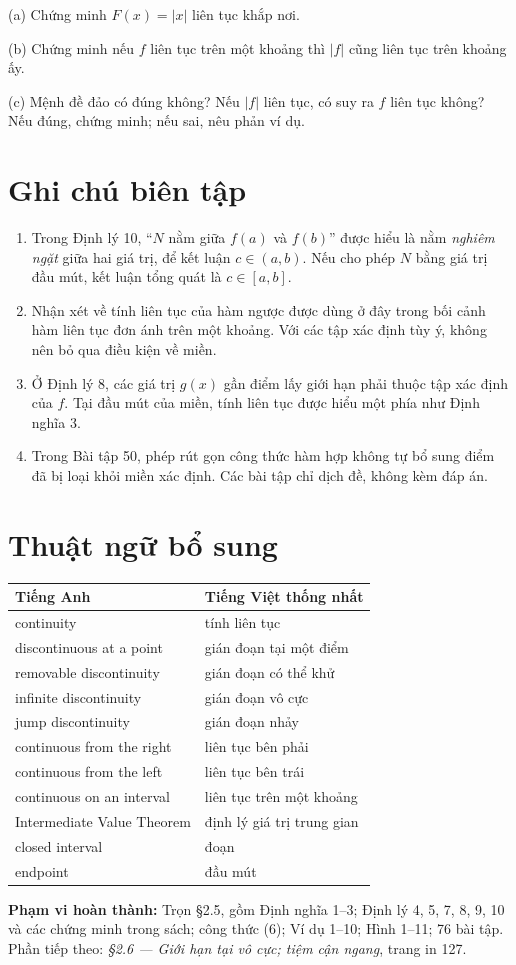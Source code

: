 \documentclass[12pt,a4paper]{article}
\begin{document}
(a) Chứng minh $F(x)=|x|$ liên tục khắp nơi.

(b) Chứng minh nếu $f$ liên tục trên một khoảng thì $|f|$ cũng liên tục trên khoảng ấy.

(c) Mệnh đề đảo có đúng không? Nếu $|f|$ liên tục, có suy ra $f$ liên tục không? Nếu đúng, chứng minh; nếu sai, nêu phản ví dụ.
\section*{Ghi chú biên tập}
\begin{enumerate}
\item Trong Định lý 10, ``$N$ nằm giữa $f(a)$ và $f(b)$'' được hiểu là nằm \textit{nghiêm ngặt} giữa hai giá trị, để kết luận $c\in(a,b)$. Nếu cho phép $N$ bằng giá trị đầu mút, kết luận tổng quát là $c\in[a,b]$.
\item Nhận xét về tính liên tục của hàm ngược được dùng ở đây trong bối cảnh hàm liên tục đơn ánh trên một khoảng. Với các tập xác định tùy ý, không nên bỏ qua điều kiện về miền.
\item Ở Định lý 8, các giá trị $g(x)$ gần điểm lấy giới hạn phải thuộc tập xác định của $f$. Tại đầu mút của miền, tính liên tục được hiểu một phía như Định nghĩa 3.
\item Trong Bài tập 50, phép rút gọn công thức hàm hợp không tự bổ sung điểm đã bị loại khỏi miền xác định. Các bài tập chỉ dịch đề, không kèm đáp án.
\end{enumerate}
\section*{Thuật ngữ bổ sung}
\begin{center}\begin{tabular}{ll}\toprule Tiếng Anh&Tiếng Việt thống nhất\\\midrule
continuity&tính liên tục\\
discontinuous at a point&gián đoạn tại một điểm\\
removable discontinuity&gián đoạn có thể khử\\
infinite discontinuity&gián đoạn vô cực\\
jump discontinuity&gián đoạn nhảy\\
continuous from the right&liên tục bên phải\\
continuous from the left&liên tục bên trái\\
continuous on an interval&liên tục trên một khoảng\\
Intermediate Value Theorem&định lý giá trị trung gian\\
closed interval&đoạn\\
endpoint&đầu mút\\
\bottomrule\end{tabular}\end{center}
\noindent\textbf{Phạm vi hoàn thành:} Trọn §2.5, gồm Định nghĩa 1–3; Định lý 4, 5, 7, 8, 9, 10 và các chứng minh trong sách; công thức (6); Ví dụ 1–10; Hình 1–11; 76 bài tập. Phần tiếp theo: \textit{§2.6 — Giới hạn tại vô cực; tiệm cận ngang}, trang in 127.
\end{document}
